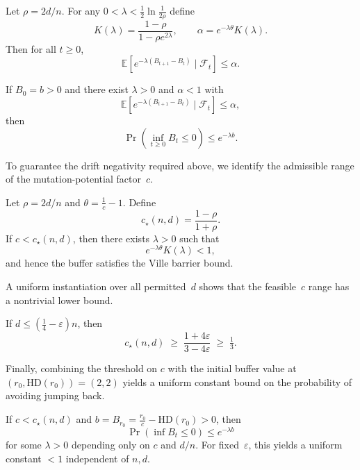\begin{lemma}
	\label{lem:drift-envelope-global}
	Let $\rho=2d/n$.  
	For any $0<\lambda<\tfrac12\ln\tfrac{1}{2\rho}$ define
	\[
	K(\lambda)=\frac{1-\rho}{1-\rho e^{2\lambda}}, 
	\qquad 
	\alpha=e^{-\lambda\theta}K(\lambda).
	\]
	Then for all $t\ge0$,
	\[
	\mathbb{E}[e^{-\lambda(B_{t+1}-B_t)}\mid\mathcal{F}_t]\le \alpha.
	\]
\end{lemma}



\begin{corollary}
	\label{cor:ville-exponential}
	
	If $B_0=b>0$ and there exist $\lambda>0$ and $\alpha<1$ with
	\[
	\mathbb{E}[e^{-\lambda(B_{t+1}-B_t)}\mid\mathcal{F}_t]\le\alpha,
	\]
	then
	\[
	\Pr\!\left(\inf_{t\ge0} B_t \le 0\right) \le e^{-\lambda b}.
	\]
\end{corollary}

To guarantee the drift negativity required above, we identify the admissible 
range of the mutation-potential factor~$c$.

\begin{lemma}%
	 \label{lem:c-threshold-instance}
	
	Let $\rho=2d/n$ and $\theta=\frac{1}{c}-1$.  
	Define
	\[
	c_\star(n,d)=\frac{1-\rho}{1+\rho}.
	\]
	If $c<c_\star(n,d)$, then there exists $\lambda>0$ such that
	\[
	e^{-\lambda\theta}K(\lambda) < 1,
	\]
	and hence the buffer satisfies the Ville barrier bound.
\end{lemma}

A uniform instantiation over all permitted~$d$ shows that the feasible~$c$ 
range has a nontrivial lower bound.

\begin{corollary}%
	If $d\le (\tfrac14-\varepsilon)n$, then
	\[
	c_\star(n,d) \;\ge\; \frac{1+4\varepsilon}{3-4\varepsilon} \;\ge\; \tfrac13.
	\]
\end{corollary}
\label{cor:c-floor}


Finally, combining the threshold on $c$ with the initial buffer value at 
$(r_0,\mathrm{HD}(r_0))=(2,2)$ yields a uniform constant bound on the 
probability of avoiding jumping back.

\begin{lemma}
	\label{lem:param-constant-c-general}
	If $c<c_\star(n,d)$ and 
	$b=B_{r_0}=\frac{r_0}{c}-\mathrm{HD}(r_0)>0$, 
	then 
	\[
	\Pr\!\left(\inf B_t \le 0\right) \le e^{-\lambda b}
	\]
	for some $\lambda>0$ depending only on $c$ and $d/n$.  
	For fixed~$\varepsilon$, this yields a uniform constant $<1$ independent of 
	$n,d$.
\end{lemma}

